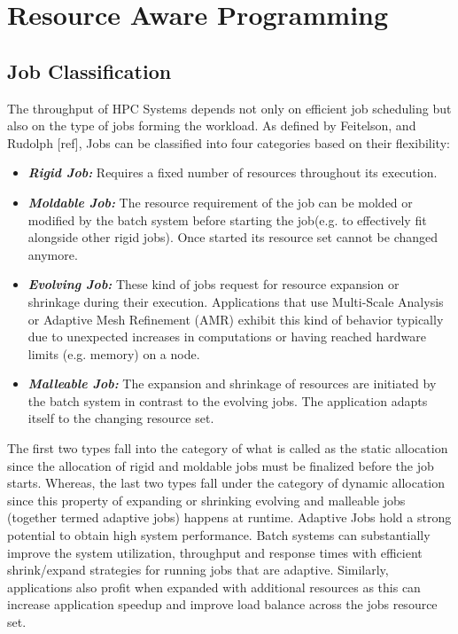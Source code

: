 \section{Resource Aware Programming}
\subsection{Job Classification}
The throughput of HPC Systems depends not only on efficient job scheduling but also on the type of jobs forming the workload. As defined by Feitelson, and Rudolph [ref], Jobs can be classified into four categories based on their flexibility:
\begin{itemize}
\item \textbf{\textit{Rigid Job:}} Requires a fixed number of resources throughout its execution.
\item \textbf{\textit{Moldable Job: }} The resource requirement of the job can be molded or modified by the batch system before starting the job(e.g. to effectively fit alongside other rigid jobs). Once started its resource set cannot be changed anymore.
\item \textbf{\textit{Evolving Job: }} These kind of jobs request for resource expansion or shrinkage during their execution. Applications that use Multi-Scale Analysis or Adaptive Mesh Refinement (AMR) exhibit this kind of behavior typically due to unexpected increases in computations or having reached hardware limits (e.g. memory) on a node.
\item \textbf{\textit{Malleable Job: }} The expansion and shrinkage of resources are initiated by the batch system in contrast to the evolving jobs. The application adapts itself to the changing resource set.
\end{itemize}
The first two types fall into the category of what is called as the static allocation since the allocation of rigid and moldable jobs must be finalized before the job starts. Whereas, the last two types fall under the category of dynamic allocation since this property of expanding or shrinking evolving and malleable jobs (together termed adaptive jobs) happens at runtime. Adaptive Jobs hold a strong potential to obtain high system performance. Batch systems can substantially improve the system utilization, throughput and response times with efficient shrink/expand strategies for running jobs that are adaptive. Similarly, applications also profit when expanded with additional resources as this can increase application speedup and improve load balance across the job\textquotesingle s resource set.
